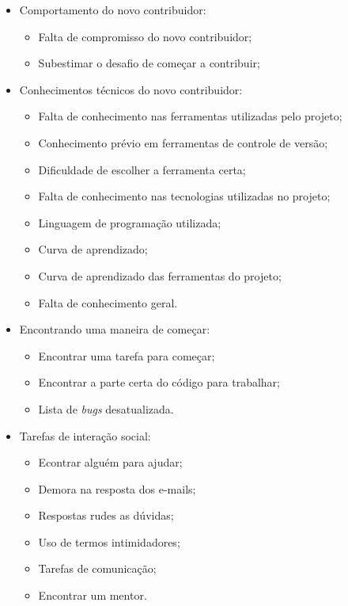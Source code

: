 \begin{itemize}
\item Comportamento do novo contribuidor:

	\begin{itemize}
	\item Falta de compromisso do novo contribuidor;
	\item Subestimar o desafio de começar a contribuir;
	\end{itemize}

\item Conhecimentos técnicos do novo contribuidor:

	\begin{itemize}
	\item Falta de conhecimento nas ferramentas utilizadas pelo projeto;
	\item Conhecimento prévio em ferramentas de controle de versão;
	\item Dificuldade de escolher a ferramenta certa;
	\item Falta de conhecimento nas tecnologias utilizadas no projeto;
	\item Linguagem de programação utilizada;
	\item Curva de aprendizado;
	\item Curva de aprendizado das ferramentas do projeto;
	\item Falta de conhecimento geral.
	\end{itemize}

\item Encontrando uma maneira de começar:
	
	\begin{itemize}
	\item Encontrar uma tarefa para começar;
	\item Encontrar a parte certa do código para trabalhar;
	\item Lista de \textit{bugs} desatualizada.
	\end{itemize}

\item Tarefas de interação social:
	
	\begin{itemize}
	\item Econtrar alguém para ajudar;
	\item Demora na resposta dos e-mails;
	\item Respostas rudes as dúvidas;
	\item Uso de termos intimidadores;
	\item Tarefas de comunicação;
	\item Encontrar um mentor.
	\end{itemize}

\end{itemize} 

